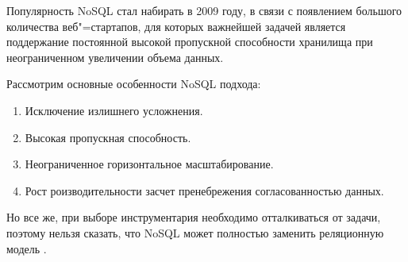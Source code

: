 Популярность NoSQL стал набирать в 2009 году, в связи с появлением большого количества веб"=стартапов, для которых важнейшей задачей является поддержание постоянной высокой пропускной способности хранилища при неограниченном увеличении объема
данных. 

Рассмотрим основные особенности NoSQL подхода:

\begin{enumerate}
    \item Исключение излишнего усложнения. 
    \item Высокая пропускная способность. 
    \item Неограниченное горизонтальное масштабирование. 
    \item Рост роизводительности засчет пренебрежения согласованностью данных.
\end{enumerate}

Но все же, при выборе инструментария необходимо отталкиваться от задачи, поэтому нельзя сказать, что NoSQL может полностью заменить реляционную модель \cite{9}.